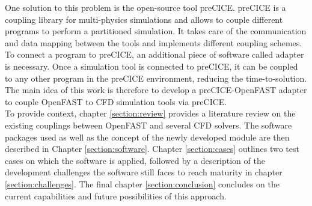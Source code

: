 One solution to this problem is the open-source tool preCICE. preCICE is a coupling library for multi-physics simulations and allows to couple different programs to perform a partitioned simulation. It takes care of the communication and data mapping between the tools and implements different coupling schemes. To connect a program to preCICE, an additional piece of software called adapter is necessary. Once a simulation tool is connected to preCICE, it can be coupled to any other program in the preCICE environment, reducing the time-to-solution. The main idea of this work is therefore to develop a preCICE-OpenFAST adapter to couple OpenFAST to CFD simulation tools via preCICE.\\
To provide context, chapter \ref{section:review} provides a literature review on the existing couplings between OpenFAST and several CFD solvers. The software packages used as well as the concept of the newly developed module are then described in Chapter \ref{section:software}. Chapter \ref{section:cases} outlines two test cases on which the software is applied, followed by a description of the development challenges the software still faces to reach maturity in chapter \ref{section:challenges}. The final chapter \ref{section:conclusion} concludes on the current capabilities and future possibilities of this approach.

